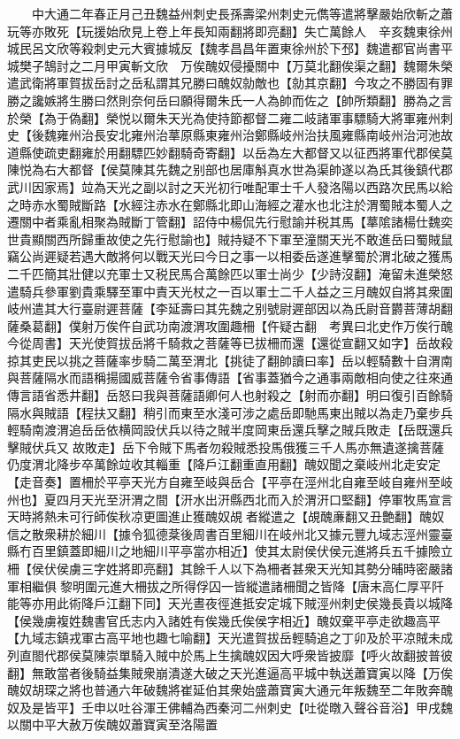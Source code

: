　　中大通二年春正月己丑魏益州刺史長孫壽梁州刺史元儁等遣將擊嚴始欣斬之蕭玩等亦敗死【玩援始欣見上卷上年長知兩翻將即亮翻】失亡萬餘人　辛亥魏東徐州城民呂文欣等殺刺史元大賓據城反【魏孝昌昌年置東徐州於下邳】魏遣都官尚書平城樊子鵠討之二月甲寅斬文欣　万俟醜奴侵擾關中【万莫北翻俟渠之翻】魏爾朱榮遣武衛將軍賀拔岳討之岳私謂其兄勝曰醜奴勍敵也【勍其京翻】今攻之不勝固有罪勝之讒嫉將生勝曰然則奈何岳曰願得爾朱氏一人為帥而佐之【帥所類翻】勝為之言於榮【為于偽翻】榮悦以爾朱天光為使持節都督二雍二岐諸軍事驃騎大將軍雍州刺史【後魏雍州治長安北雍州治蕐原縣東雍州治鄭縣岐州治扶風雍縣南岐州治河池故道縣使疏吏翻雍於用翻驃匹妙翻騎奇寄翻】以岳為左大都督又以征西將軍代郡侯莫陳悦為右大都督【侯莫陳其先魏之别部也居庫斛真水世為渠帥遂以為氏其後鎮代郡武川因家焉】竝為天光之副以討之天光初行唯配軍士千人發洛陽以西路次民馬以給之時赤水蜀賊斷路【水經注赤水在鄭縣北即山海經之灌水也北注於渭蜀賊本蜀人之遷關中者乘亂相聚為賊斷丁管翻】詔侍中楊侃先行慰諭并税其馬【蕐隂諸楊仕魏奕世貴顯關西所歸重故使之先行慰諭也】賊持疑不下軍至潼關天光不敢進岳曰蜀賊鼠竊公尚遲疑若遇大敵將何以戰天光曰今日之事一以相委岳遂進擊蜀於渭北破之獲馬二千匹簡其壯健以充軍士又税民馬合萬餘匹以軍士尚少【少詩沒翻】淹留未進榮怒遣騎兵參軍劉貴乘驛至軍中責天光杖之一百以軍士二千人益之三月醜奴自將其衆圍岐州遣其大行臺尉遲菩薩【李延壽曰其先魏之别號尉遲部因以為氏尉音欝菩薄胡翻薩桑葛翻】僕射万俟仵自武功南渡渭攻圍趣柵【仵疑古翻　考異曰北史作万俟行醜今從周書】天光使賀拔岳將千騎救之菩薩等已拔柵而還【還從宣翻又如字】岳故殺掠其吏民以挑之菩薩率步騎二萬至渭北【挑徒了翻帥讀曰率】岳以輕騎數十自渭南與菩薩隔水而語稱揚國威菩薩令省事傳語【省事蓋猶今之通事兩敵相向使之往來通傳言語省悉井翻】岳怒曰我與菩薩語卿何人也射殺之【射而亦翻】明曰復引百餘騎隔水與賊語【程扶又翻】稍引而東至水淺可涉之處岳即馳馬東出賊以為走乃棄步兵輕騎南渡渭追岳岳依横岡設伏兵以待之賊半度岡東岳還兵擊之賊兵敗走【岳既還兵擊賊伏兵又故敗走】岳下令賊下馬者勿殺賊悉投馬俄獲三千人馬亦無遺遂擒菩薩仍度渭北降步卒萬餘竝收其輜重【降戶江翻重直用翻】醜奴聞之棄岐州北走安定【走音奏】置柵於平亭天光方自雍至岐與岳合【平亭在涇州北自雍至岐自雍州至岐州也】夏四月天光至汧渭之間【汧水出汧縣西北而入於渭汧口堅翻】停軍牧馬宣言天時將熱未可行師俟秋凉更圖進止獲醜奴覘者縱遣之【覘醜亷翻又丑艶翻】醜奴信之散衆耕於細川【據令狐德棻後周書百里細川在岐州北又據元豐九域志涇州靈臺縣冇百里鎮蓋即細川之地細川平亭當亦相近】使其太尉侯伏侯元進將兵五千據險立柵【侯伏侯虜三字姓將即亮翻】其餘千人以下為柵者甚衆天光知其勢分晡時密嚴諸軍相繼俱黎明圍元進大柵拔之所得俘囚一皆縱遣諸柵聞之皆降【唐末高仁厚平阡能等亦用此術降戶江翻下同】天光晝夜徑進抵安定城下賊涇州刺史侯幾長貴以城降【侯幾虜複姓魏書官氏志内入諸姓有俟幾氏俟侯字相近】醜奴棄平亭走欲趣高平【九域志鎮戎軍古高平地也趣七喻翻】天光遣賀拔岳輕騎追之丁卯及於平凉賊未成列直閤代郡侯莫陳崇單騎入賊中於馬上生擒醜奴因大呼衆皆披靡【呼火故翻披普彼翻】無敢當者後騎益集賊衆崩潰遂大破之天光進逼高平城中執送蕭寶寅以降【万俟醜奴胡琛之將也普通六年破魏將崔延伯其衆始盛蕭寶寅大通元年叛魏至二年敗奔醜奴及是皆平】壬申以吐谷渾王佛輔為西秦河二州刺史【吐從暾入聲谷音浴】甲戌魏以關中平大赦万俟醜奴蕭寶寅至洛陽置

